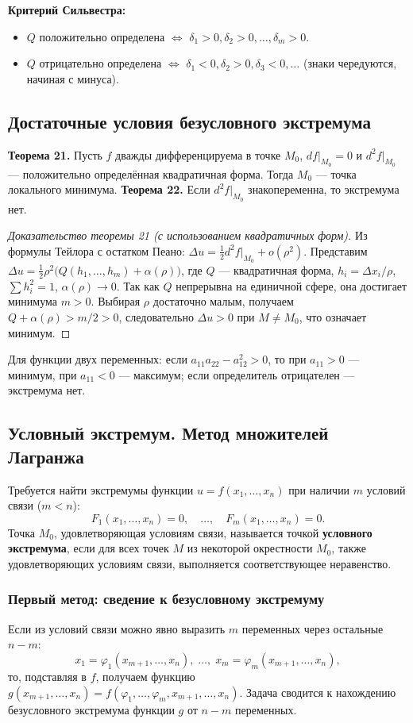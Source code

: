 \documentclass{article}
\theoremstyle{definition}
\begin{document}
\textbf{Критерий Сильвестра:}
\begin{itemize}
    \item $Q$ положительно определена $\iff$ $\delta_1>0,\delta_2>0,\dots,\delta_m>0$.
    \item $Q$ отрицательно определена $\iff$ $\delta_1<0,\delta_2>0,\delta_3<0,\dots$ (знаки чередуются, начиная с минуса).
\end{itemize}

\subsection{Достаточные условия безусловного экстремума}
\textbf{Теорема 21.} Пусть $f$ дважды дифференцируема в точке $M_0$, $df|_{M_0}=0$ и $d^2f|_{M_0}$ — положительно определённая квадратичная форма. Тогда $M_0$ — точка локального минимума.
\textbf{Теорема 22.} Если $d^2f|_{M_0}$ знакопеременна, то экстремума нет.

\begin{proof}[Доказательство теоремы 21 (с использованием квадратичных форм)]
Из формулы Тейлора с остатком Пеано: $\Delta u = \frac12 d^2f|_{M_0} + o(\rho^2)$. Представим $\Delta u = \frac12 \rho^2\bigl(Q(h_1,\dots,h_m)+\alpha(\rho)\bigr)$, где $Q$ — квадратичная форма, $h_i=\Delta x_i/\rho$, $\sum h_i^2=1$, $\alpha(\rho)\to0$. Так как $Q$ непрерывна на единичной сфере, она достигает минимума $m>0$. Выбирая $\rho$ достаточно малым, получаем $Q+\alpha(\rho) > m/2 >0$, следовательно $\Delta u>0$ при $M\neq M_0$, что означает минимум.
\end{proof}

Для функции двух переменных: если $a_{11}a_{22}-a_{12}^2>0$, то при $a_{11}>0$ — минимум, при $a_{11}<0$ — максимум; если определитель отрицателен — экстремума нет.

\subsection{Условный экстремум. Метод множителей Лагранжа}
Требуется найти экстремумы функции $u=f(x_1,\dots,x_n)$ при наличии $m$ условий связи ($m<n$):
\[
F_1(x_1,\dots,x_n)=0,\quad\dots,\quad F_m(x_1,\dots,x_n)=0.
\]
Точка $M_0$, удовлетворяющая условиям связи, называется точкой \textbf{условного экстремума}, если для всех точек $M$ из некоторой окрестности $M_0$, также удовлетворяющих условиям связи, выполняется соответствующее неравенство.

\subsubsection{Первый метод: сведение к безусловному экстремуму}
Если из условий связи можно явно выразить $m$ переменных через остальные $n-m$:
\[
x_1 = \varphi_1(x_{m+1},\dots,x_n),\;\dots,\;x_m = \varphi_m(x_{m+1},\dots,x_n),
\]
то, подставляя в $f$, получаем функцию $g(x_{m+1},\dots,x_n)=f(\varphi_1,\dots,\varphi_m,x_{m+1},\dots,x_n)$. Задача сводится к нахождению безусловного экстремума функции $g$ от $n-m$ переменных.
\end{document}

